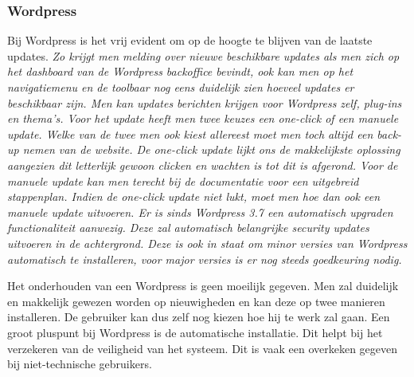 \subsubsection{Wordpress}
Bij Wordpress is het vrij evident om op de hoogte te blijven van de laatste updates. \textit{Zo krijgt men melding over nieuwe beschikbare updates als men zich op het dashboard van de Wordpress backoffice bevindt, ook kan men op het navigatiemenu en de toolbaar nog eens duidelijk zien hoeveel updates er beschikbaar zijn. Men kan updates berichten krijgen voor Wordpress zelf, plug-ins en thema's. Voor het update heeft men twee keuzes een one-click of een manuele update. Welke van de twee men ook kiest allereest moet men toch altijd een back-up nemen van de website. De one-click update lijkt ons de makkelijkste oplossing aangezien dit letterlijk gewoon clicken en wachten is tot dit is afgerond. Voor de manuele update kan men terecht bij de documentatie voor een uitgebreid stappenplan. Indien de one-click update niet lukt, moet men hoe dan ook een manuele update uitvoeren. Er is sinds Wordpress 3.7 een automatisch upgraden functionaliteit aanwezig. Deze zal automatisch belangrijke security updates uitvoeren in de achtergrond. Deze is ook in staat om minor versies van Wordpress automatisch te installeren, voor major versies is er nog steeds goedkeuring nodig. }\autocite{WordpressCommunity2019a}

Het onderhouden van een Wordpress is geen moeilijk gegeven. Men zal duidelijk en makkelijk gewezen worden op nieuwigheden en kan deze op twee manieren installeren. De gebruiker kan dus zelf nog kiezen hoe hij te werk zal gaan. Een groot pluspunt bij Wordpress is de automatische installatie. Dit helpt bij het verzekeren van de veiligheid van het systeem. Dit is vaak een overkeken gegeven bij niet-technische gebruikers.
